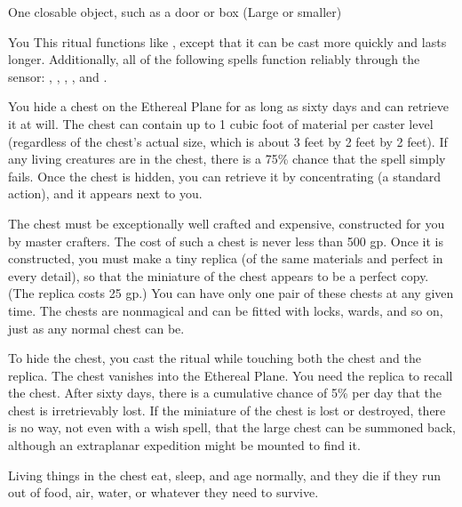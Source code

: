 \begin{spelltarget}{One closable object, such as a door or box (Large or smaller)}
\begin{spelltarget}{You}
\spelldur{\durext}
\spelleffect This ritual functions like , except that it can be cast more quickly and lasts longer. Additionally, all of the following spells function reliably through the sensor: , , , , and .

\spelleffect You hide a chest on the Ethereal Plane for as long as sixty days and can retrieve it at will. The chest can contain up to 1 cubic foot of material per caster level (regardless of the chest's actual size, which is about 3 feet by 2 feet by 2 feet). If any living creatures are in the chest, there is a 75\% chance that the spell simply fails. Once the chest is hidden, you can retrieve it by concentrating (a standard action), and it appears next to you.
\par The chest must be exceptionally well crafted and expensive, constructed for you by master crafters. The cost of such a chest is never less than 500 gp. Once it is constructed, you must make a tiny replica (of the same materials and perfect in every detail), so that the miniature of the chest appears to be a perfect copy. (The replica costs 25 gp.) You can have only one pair of these chests at any given time. The chests are nonmagical and can be fitted with locks, wards, and so on, just as any normal chest can be.
\par To hide the chest, you cast the ritual while touching both the chest and the replica. The chest vanishes into the Ethereal Plane. You need the replica to recall the chest. After sixty days, there is a cumulative chance of 5\% per day that the chest is irretrievably lost. If the miniature of the chest is lost or destroyed, there is no way, not even with a wish spell, that the large chest can be summoned back, although an extraplanar expedition might be mounted to find it.
\par Living things in the chest eat, sleep, and age normally, and they die if they run out of food, air, water, or whatever they need to survive.


\end{spelltarget}
\end{spelltarget}
